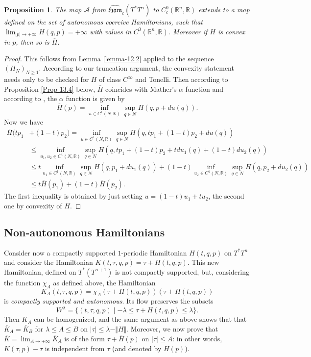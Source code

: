 \documentclass[JEP,XML,SOM,NoFloatCountersInSection,Unicode,published]{cedram}
\numberwithin{equation}{section}
\newcommand {\Ham}{{\mathfrak {Ham}}}
\newcommand{\gclHamc}[1]{\widehat{\Ham}_c(#1)}
\theoremstyle{plain}
\newtheorem{proposition}[theorem]{Proposition}
\theoremstyle{definition}
\theoremstyle{remark}
\begin{document}
\begin{proposition}\label{Prop-12.4}
The map $\mathcal{A}$ from $\gclHamc{T^*T^n}$ to $C_c^{0}({\mathbb R} ^n, {\mathbb R})$ extends to a map defined on the set of autonomous coercive Hamiltonians, \ie such that $\lim_{ \vert p \vert \to +\infty }H(q,p)=+\infty$ with values in $C^0({\mathbb R}^n, {\mathbb R})$. Moreover if $H$ is convex in $p$, then so is $\overline H$.
\end{proposition}
\begin{proof}
This follows from Lemma \ref{lemma-12.2} applied to the sequence $(H_{N})_{N\geq 1}$.
According to our truncation argument, the convexity statement needs only to be checked for $H$ of class $C^\infty$ and Tonelli. Then according to Proposition \ref{Prop-13.4} below, $\overline H$ coincides with Mather's $\alpha $ function and according to \cite[Th.\,A \& Cor.\,1]{CIPP}, the $\alpha$ function is given by
\[
\overline H(p)= \inf_{u\in C^1(N, {\mathbb R})} \sup_{q\in N} H(q,p+du(q)).
\]
Now we have
\begin{align*}
\overline H(tp_1&+(1-t)p_2)= \inf_{u\in C^1(N, {\mathbb R})} \sup_{q\in N} H(q,tp_1+(1-t)p_2+du(q))\\
& \leq \inf_{u_1,u_2\in C^1(N, {\mathbb R})} \sup_{q\in N} H(q,tp_1+(1-t)p_2+tdu_1(q)+(1-t)du_2(q))\\
& \leq t \inf_{u_1\in C^1(N, {\mathbb R})} \sup_{q\in N} H(q,p_1+du_1(q))+ (1-t) \inf_{u_2\in C^1(N, {\mathbb R})} \sup_{q\in N}H(q,p_2+du_2(q))\\
& \leq  t \overline H(p_1)+ (1-t) \overline H(p_2).
\end{align*}
The first inequality is obtained by just setting $u=(1-t)u_1+tu_2$, the second one by convexity of $H$.
\end{proof}

\subsection{Non-autonomous Hamiltonians}\label{naut}
Consider now a compactly supported $1$\nobreakdash-pe\-ri\-odic Hamiltonian $H(t,q,p)$ on $T^*T^n$ and consider the Hamiltonian $K(t,\tau, q,p)=\tau+H(t,q,p)$. This new Hamiltonian, defined on $T^*(T^{n+1})$ is not compactly supported, but, considering the function $\chi_{A}$ as defined above, the Hamiltonian
\[
K_A(t,\tau,q,p)=\chi_{A}(\tau+H(t,q,p)) (\tau+H(t,q,p))
\]
is \emph{compactly supported and autonomous}.
Its flow preserves the subsets
\[
W^\lambda=\{(t,\tau,q,p) \mid - \lambda \leq \tau + H(t,q,p) \leq \lambda \}.
\]
Then $K_A$ can be homogenized, and the same argument as above shows that that ${\overline K}_A = \overline K_{B}$ for $\lambda \leq A \leq B$ on $ \vert \tau \vert \leq \lambda- \Vert H\Vert$. Moreover, we now prove that $\overline K = \lim_{A\to +\infty} \overline K_{A}$ is of the form $\tau + \overline{H}(p)$ on $ \vert \tau \vert \leq A$: in other words, ${\overline K}(\tau,p)-\tau$ is independent from $\tau$ (and denoted by ${\overline H}(p)$).
\end{document}
